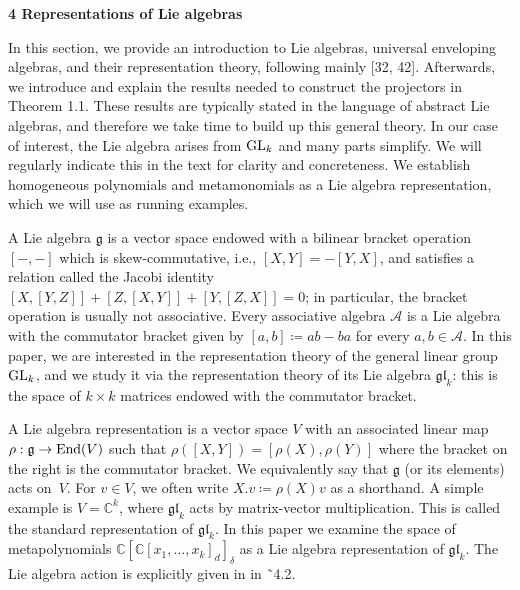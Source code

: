 

\par\medskip\noindent\textbf{4 Representations of Lie algebras}\par




In this section, we provide an introduction to Lie algebras, universal enveloping algebras, and their representation theory, following mainly [32, 42].
Afterwards, we introduce and explain the results needed to construct the projectors in Theorem 1.1. These results are typically stated in the language of abstract Lie algebras, and therefore we take time to build up this general theory. In our case of interest, the Lie algebra arises from $\textnormal{GL}_{k}$ and many parts simplify.
We will regularly indicate this in the text for clarity and concreteness.
We establish homogeneous polynomials and metamonomials as a Lie algebra representation, which we will use as running examples.





A Lie algebra $\mathfrak{g}$ is a vector space endowed with a bilinear bracket operation $[-,-]$ which is skew-commutative, i.e., $[X,Y]=-[Y,X]$, and satisfies a relation called the Jacobi identity $[X,[Y,Z]]+[Z,[X,Y]]+[Y,[Z,X]]=0$; in particular, the bracket operation is usually not associative. Every associative algebra $\mathcal{A}$ is a Lie algebra with the commutator bracket given by $[a,b]\coloneqq ab-ba$ for every $a,b\in\mathcal{A}$. In this paper, we are interested in the representation theory of the general linear group $\textnormal{GL}_{k}$, and we study it via the representation theory of its Lie algebra $\mathfrak{gl}_{k}$: this is the space of $k\times k$ matrices endowed with the commutator bracket.





A Lie algebra representation is a vector space $V$ with an associated linear map $\rho:\mathfrak{g}\to\textnormal{End}(V)$ such that $\rho([X,Y])=[\rho(X),\rho(Y)]$ where the bracket on the right is the commutator bracket. We equivalently say that $\mathfrak{g}$ (or its elements) acts on $V$. For $v\in V$, we often write $X.v\coloneqq\rho(X)v$ as a shorthand.
A simple example is $V=\mathbb{C}^{k}$, where $\mathfrak{gl}_{k}$ acts by matrix-vector multiplication. This is called the standard representation of $\mathfrak{gl}_{k}$.
In this paper we examine the space of metapolynomials $\mathbb{C}[\mathbb{C}[x_{1},\ldots,x_{k}]_{d}]_{\delta}$ as a Lie algebra representation of $\mathfrak{gl}_{k}$. The Lie algebra action is explicitly given in in ˜4.2.





